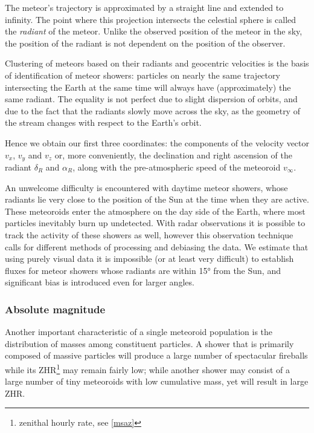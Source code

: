             The meteor's trajectory is approximated by a straight line and extended to infinity.
            The point where this projection intersects the celestial sphere is called the \emph{radiant} of the meteor.
            Unlike the observed position of the meteor in the sky,
            the position of the radiant is not dependent on the position of the observer.

            Clustering of meteors based on their radiants and geocentric velocities
            is the basis of identification of meteor showers: particles on nearly the same trajectory intersecting
            the Earth at the same time will always have (approximately) the same radiant.
            The equality is not perfect due to slight dispersion of orbits,
            and due to the fact that the radiants slowly move across the sky,
            as the geometry of the stream changes with respect to the Earth's orbit.

            Hence we obtain our first three coordinates: the components of the velocity vector $v_x$, $v_y$ and $v_z$
            or, more conveniently, the declination and right ascension of the radiant $\delta_R$ and $\alpha_R$,
            along with the pre-atmospheric speed of the meteoroid $v_\infty$.

            An unwelcome difficulty is encountered with daytime meteor showers, whose radiants
            lie very close to the position of the Sun at the time when they are active.
            These meteoroids enter the atmosphere on the day side of the Earth,
            where most particles inevitably burn up undetected.
            With radar observations it is possible to track the activity of these showers as well,
            however this observation technique calls for different methods of processing and debiasing the data.
            We estimate that using purely visual data it is impossible (or at least very difficult) to establish fluxes
            for meteor showers whose radiants are within \ang{15} from the Sun, and significant bias
            is introduced even for larger angles.

        \subsubsection{Absolute magnitude} \label{mspm}
            Another important characteristic of a single meteoroid population is the distribution of masses
            among constituent particles. A shower that is primarily composed of massive particles
            will produce a large number of spectacular fireballs while its ZHR\footnote{zenithal hourly rate, see \cref{msaz}} may remain fairly low;
            while another shower may consist of a large number of tiny meteoroids with low cumulative mass,
            yet will result in large ZHR.

